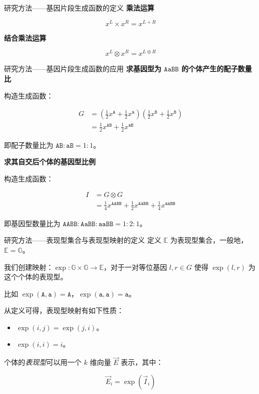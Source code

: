 \documentclass[10pt,aspectratio=43,mathserif]{ctexbeamer}
\begin{document}
	\begin{frame}{研究方法——基因片段生成函数的定义}
		\textbf{乘法运算}
		
		$$x^L \times x^R=x^{L+R}$$
		
		\textbf{结合乘法运算}
		
		$$x^L \otimes x^R=x^{L \oplus R}$$
	\end{frame}

	\begin{frame}{研究方法——基因片段生成函数的应用}
		\textbf{求基因型为 $\texttt{AaBB}$ 的个体产生的配子数量比}
		
		构造生成函数：
		
		$$\begin{aligned}
			G &= (\frac{1}{2} x^{\texttt{A}}+ \frac{1}{2}x^{\texttt{a}})(\frac{1}{2} x^{\texttt{B}}+ \frac{1}{2}x^{\texttt{B}}) \\
			&= \frac{1}{2} x^{\texttt{AB}} + \frac{1}{2} x^{\texttt{aB}}
		\end{aligned}$$
		
		即配子数量比为 $\texttt{AB} : \texttt{aB}=1:1$。
		
		\textbf{求其自交后个体的基因型比例}
		
		构造生成函数：
		
		$$\begin{aligned}
			I &= G \otimes G \\
			&= \frac{1}{4} x^{\texttt{AABB}} + \frac{1}{2} x^{\texttt{AaBB}} + \frac{1}{4} x^{\texttt{aaBB}}
		\end{aligned}$$
		
		即基因型数量比为 $\texttt{AABB} : \texttt{AaBB} : \texttt{aaBB}=1:2:1$。
	\end{frame}

	\begin{frame}{研究方法——表现型集合与表现型映射的定义}
		定义 $\mathbb{E}$ 为表现型集合，一般地，$\mathbb{E}=\mathbb{G}$。
		
		我们创建映射：$\operatorname{exp}:\mathbb{G} \times \mathbb{G} \to \mathbb{E}$，对于一对等位基因 $l,r \in G$ 使得 $\operatorname{exp}(l,r)$ 为这个个体的表现型。
		
		
		比如 $\operatorname{exp}(\texttt{A},\texttt{a})=\texttt{A}$，$\operatorname{exp}(\texttt{a},\texttt{a})=\texttt{a}$。
		
		从定义可得，表现型映射有如下性质：
		
		\begin{itemize}
			\item $\operatorname{exp}(i,j)=\operatorname{exp}(j,i)$。
			\item $\operatorname{exp}(i,i)=i$。
		\end{itemize}
	
		个体的\textsl{表现型}可以用一个 $k$ 维向量 $\vec E$ 表示，其中：
		
		$$\vec E_i=\operatorname{exp}(\vec I_i)$$
	\end{frame}
\end{document}
